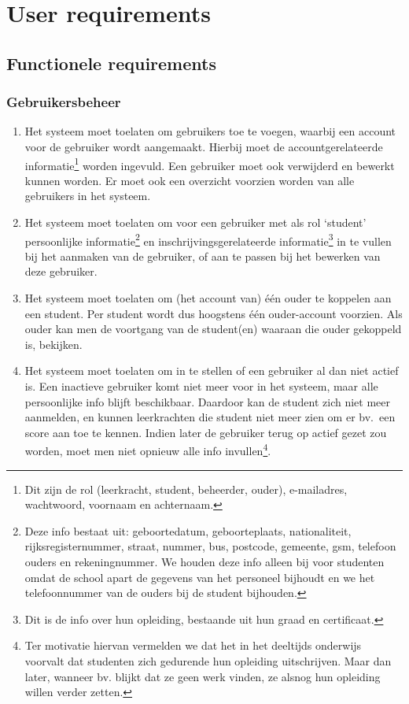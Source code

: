 \documentclass[a4paper]{article}
\begin{document}
\newpage
\section{User requirements}  \label{sec:user_req}%
\subsection{Functionele requirements}

\subsubsection{Gebruikersbeheer}
\begin{enumerate}[label=F\arabic*]
\item \label{itm:account_info} Het systeem moet toelaten om gebruikers toe te voegen, waarbij een account voor de gebruiker wordt aangemaakt. Hierbij moet de accountgerelateerde informatie\footnote{Dit zijn de rol (leerkracht, student, beheerder, ouder), e-mailadres, wachtwoord, voornaam en achternaam.} worden ingevuld. Een gebruiker moet ook verwijderd en bewerkt kunnen worden. Er moet ook een overzicht voorzien worden van alle gebruikers in het systeem.
\item \label{itm:student_info} Het systeem moet toelaten om voor een gebruiker met als rol `student' persoonlijke informatie\footnote{Deze info bestaat uit: geboortedatum, geboorteplaats, nationaliteit, rijksregisternummer, straat, nummer, bus, postcode, gemeente, gsm, telefoon ouders en rekeningnummer. We houden deze info alleen bij voor studenten omdat de school apart de gegevens van het personeel bijhoudt en we het telefoonnummer van de ouders bij de student bijhouden.} en inschrijvingsgerelateerde informatie\footnote{Dit is de info over hun opleiding, bestaande uit hun graad en certificaat.} in te vullen bij het aanmaken van de gebruiker, of aan te passen bij het bewerken van deze gebruiker.
\item Het systeem moet toelaten om (het account van) \'e\'en ouder te koppelen aan een student. Per student wordt dus hoogstens \'e\'en ouder-account voorzien. Als ouder kan men de voortgang van de student(en) waaraan die ouder gekoppeld is, bekijken.
\item Het systeem moet toelaten om in te stellen of een gebruiker al dan niet actief is. Een inactieve gebruiker komt niet meer voor in het systeem, maar alle persoonlijke info blijft beschikbaar. Daardoor kan de student zich niet meer aanmelden, en kunnen leerkrachten die student niet meer zien om er bv.\ een score aan toe te kennen. Indien later de gebruiker terug op actief gezet zou worden, moet men niet opnieuw alle info invullen\footnote{Ter motivatie hiervan vermelden we dat het in het deeltijds onderwijs voorvalt dat studenten zich gedurende hun opleiding uitschrijven. Maar dan later, wanneer bv. blijkt dat ze geen werk vinden, ze alsnog hun opleiding willen verder zetten.}.
\end{enumerate}
\end{document}
